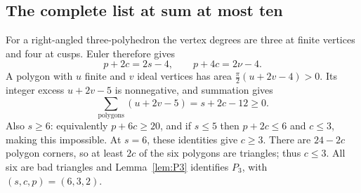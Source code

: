 \documentclass[11pt]{article}
\theoremstyle{definition}\newtheorem{definition}[theorem]{Definition}
\theoremstyle{remark}\newtheorem{remark}[theorem]{Remark}
\newcommand{\nuu}{\nu}
\newcommand{\Pthree}{P_3}
\begin{document}
\subsection{The complete list at sum at most ten}
For a right-angled three-polyhedron the vertex degrees are three at
finite vertices and four at cusps. Euler therefore gives
\begin{equation}\label{eq:Euler3}
 p+2c=2s-4,\qquad p+4c=2\nuu-4.
\end{equation}
A polygon with \(u\) finite and \(v\) ideal vertices has area
\(\frac\pi2(u+2v-4)>0\). Its integer excess \(u+2v-5\) is
nonnegative, and summation gives
\begin{equation}\label{eq:facetexcess}
 \sum_{\text{polygons}}(u+2v-5)=s+2c-12\ge0.
\end{equation}
Also \(s\ge6\): equivalently \(p+6c\ge20\), and if \(s\le5\)
then \(p+2c\le6\) and \(c\le3\), making this impossible. At
\(s=6\), these identities give \(c\ge3\). There are \(24-2c\)
polygon corners, so at least \(2c\) of the six polygons are triangles;
thus \(c\le3\). All six are bad triangles and Lemma~\ref{lem:P3}
identifies \(\Pthree\), with \((s,c,p)=(6,3,2)\).
\end{document}

